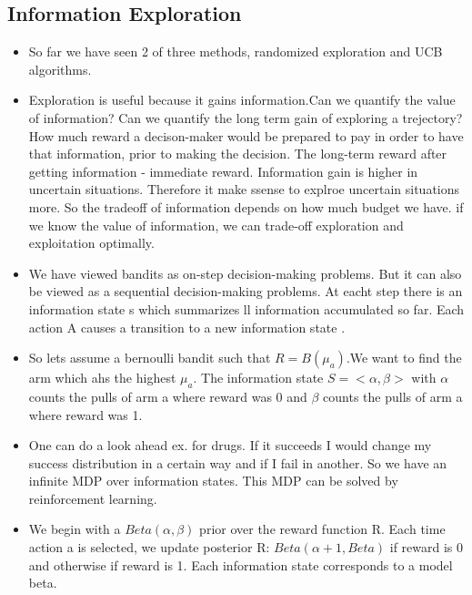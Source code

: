 \documentclass[a4paper]{article}
\begin{document}
    \subsection{Information Exploration}
    \begin{itemize}
        \item So far we have seen 2 of three methods, randomized exploration and UCB algorithms. 
        \item Exploration is useful because it gains information.Can we quantify the value of information? Can we quantify the long term gain of exploring a trejectory? How much reward a decison-maker would be prepared to pay in order to have that information, prior to making the decision. The long-term reward after getting information - immediate reward. Information gain is higher in uncertain situations. Therefore it make ssense to explroe uncertain situations more.  So the tradeoff of information depends on how much budget we have. if we know the value of information, we can trade-off exploration and exploitation optimally. 
        \item We have viewed bandits as on-step decision-making problems. But it can also be viewed as a sequential decision-making problems. At eacht step there is an information state s which summarizes ll information accumulated so far. Each action A causes a transition to a new information state .
        \item So lets assume a bernoulli bandit such that $R=B(\mu_a)$.We want to find the arm which ahs the highest $\mu_a$. The information state $S= <\alpha, \beta>$ with $\alpha$ counts the pulls of arm a where reward was 0 and $\beta$ counts the pulls of arm a where reward was 1. 
        \item One can do a look ahead ex. for drugs. If it succeeds I would change my success distribution in a certain way and if I fail in another. So we have an infinite MDP over information states. This MDP can be solved by reinforcement learning. 
        \item We begin with a $Beta(\alpha, \beta)$ prior over the reward function R. Each time action a is selected, we update posterior R: $Beta(\alpha +1, Beta)$ if reward is 0 and otherwise if reward is 1. Each information state  corresponds to a model beta. 
    \end{itemize}
\end{document}
